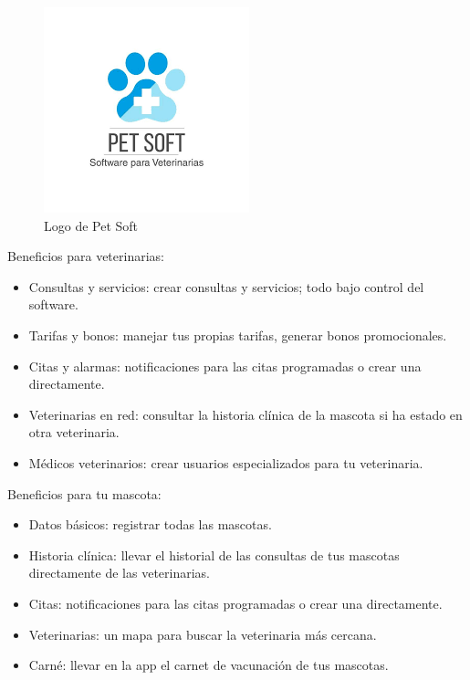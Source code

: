 \begin{figure}[!h]
	\begin{center}
		\includegraphics[scale=0.5]{Graphics/images/LogodePetSoft.png}
		\caption{Logo de Pet Soft}
		\label{fig:dh}
		
	\end{center}
\end{figure}
Beneficios para veterinarias:
\begin{itemize}
	
	
	\item	Consultas y servicios: crear consultas y servicios; todo bajo control del software.
	\item	Tarifas y bonos: manejar tus propias tarifas, generar bonos promocionales.
	\item	Citas y alarmas: notificaciones para las citas programadas o crear una directamente.
	\item	Veterinarias en red: consultar la historia clínica de la mascota si ha estado en otra veterinaria.
	\item	Médicos veterinarios: crear usuarios especializados para tu veterinaria.
	
\end{itemize}

Beneficios para tu mascota:
\begin{itemize}
	
	
	\item	Datos básicos: registrar todas las mascotas.
	\item	Historia clínica: llevar el historial de las consultas de tus mascotas directamente de las veterinarias.
	\item	Citas: notificaciones para las citas programadas o crear una directamente.
	\item	Veterinarias: un mapa para buscar la veterinaria más cercana.
	\item	Carné: llevar en la app el carnet de vacunación de tus mascotas.
\end{itemize}

